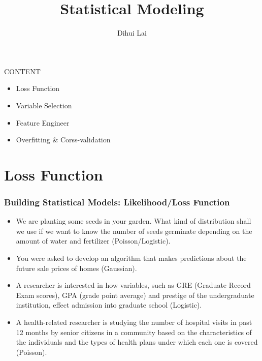 \documentclass[notheorems, aspectratio=54, tikz,border=10pt,multi]{beamer}
\title{Statistical Modeling}
\author{Dihui Lai}
\institute[WUSTL]{dlai@wustl.edu}
\begin{document}
\begin{frame}
    \titlepage
\end{frame}


\begin{frame}
CONTENT
\begin{itemize}
\item Loss Function
\item Variable Selection
\item Feature Engineer
\item Overfitting \& Corss-validation
\end{itemize} 
\end{frame}


\section{Loss Function}

\begin{frame}
\frametitle{Building Statistical Models: Likelihood/Loss Function}
\begin{itemize}
\item We are planting some seeds in your garden. What kind of distribution shall we use if we want to know the number of seeds germinate depending on the amount of water and fertilizer (Poisson/Logistic).
\item You were asked to develop an algorithm that makes predictions about the future sale prices of homes (Gaussian).
\item A researcher is interested in how variables, such as GRE (Graduate Record Exam scores), GPA (grade point average) and prestige of the undergraduate institution, effect admission into graduate school (Logistic).
\item A health-related researcher is studying the number of hospital visits in past 12 months by senior citizens in a community based on the characteristics of the individuals and the types of health plans under which each one is covered (Poisson).
\end{itemize}

\end{frame}
\end{document}
